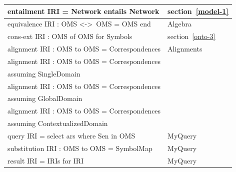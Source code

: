 \documentclass[10pt, a4paper]{isov2}
\newcommand*{\lessthan}{<}
\newcommand*{\greaterthan}{>}
\begin{document}
\begin{tabular}{|l|l|}
entailment IRI = Network entails Network & section~\ref{model-1}\\\hline
equivalence IRI : OMS \lessthan-\greaterthan\ OMS = OMS end  &  Algebra \\\hline
cons-ext IRI : OMS of OMS for Symbols  & section~\ref{onto-3} \\\hline
alignment IRI : OMS to OMS = Correspondences  & Alignments \\\hline
alignment IRI : OMS to OMS = Correspondences & \\
\qquad assuming SingleDomain & \cite{OM2014} \\\hline
alignment IRI : OMS to OMS = Correspondences & \\
\qquad assuming GlobalDomain & \cite{OM2014} \\\hline
alignment IRI : OMS to OMS = Correspondences & \\
\qquad assuming ContextualizedDomain & \cite{OM2014} \\\hline
query IRI = select ars where Sen in OMS & MyQuery\\\hline
substitution IRI : OMS to OMS = SymbolMap & MyQuery\\\hline
result IRI = IRIs for IRI & MyQuery\\\hline
\end{tabular}
\end{document}

